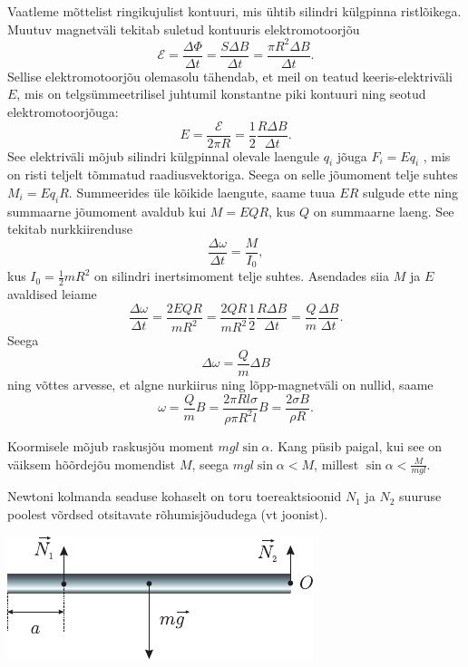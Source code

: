 \documentclass[10pt]{article}
\begin{document}
{%

\solu
Vaatleme mõttelist ringikujulist kontuuri, mis ühtib silindri külgpinna ristlõikega. Muutuv magnetväli tekitab suletud kontuuris elektromotoorjõu
\[
\mathcal{E}=\frac{\Delta \Phi}{\Delta t}=\frac{S \Delta B}{\Delta t}=\frac{\pi R^{2} \Delta B}{\Delta t}.
\]
Sellise elektromotoorjõu olemasolu tähendab, et meil on teatud keeris-elektriväli $E$, mis on telgsümmeetrilisel juhtumil konstantne piki kontuuri ning seotud elektromotoorjõuga:
\[
E=\frac{\mathcal{E}}{2 \pi R}=\frac{1}{2} \frac{R \Delta B}{\Delta t}.
\]
See elektriväli mõjub silindri külgpinnal olevale laengule $q_i$ jõuga $F_i = Eq_i$ , mis on risti teljelt tõmmatud raadiusvektoriga. Seega on selle jõumoment telje suhtes $M_i = Eq_iR$. Summeerides üle kõikide laengute, saame tuua $ER$ sulgude ette ning summaarne jõumoment avaldub kui $M = EQR$, kus $Q$ on summaarne laeng. See tekitab nurkkiirenduse
\[
\frac{\Delta \omega}{\Delta t}=\frac{M}{I_{0}},
\]
kus $I_0 = \frac{1}{2}mR^2$ on silindri inertsimoment telje suhtes. Asendades siia $M$ ja $E$ avaldised leiame
\[
\frac{\Delta \omega}{\Delta t}=\frac{2 E Q R}{m R^{2}}=\frac{2 Q R}{m R^{2}} \frac{1}{2} \frac{R \Delta B}{\Delta t}=\frac{Q}{m} \frac{\Delta B}{\Delta t}.
\]
Seega
\[
\Delta \omega=\frac{Q}{m} \Delta B
\]
ning võttes arvesse, et algne nurkiirus ning lõpp-magnetväli on nullid, saame
\[
\omega=\frac{Q}{m} B=\frac{2 \pi R l \sigma}{\rho \pi R^{2} l} B=\frac{2 \sigma B}{\rho R}.
\]
\probend
\bigskip


\solu
Koormisele mõjub raskusjõu moment $mgl\sin \alpha$. Kang püsib paigal, kui see on väiksem hõõrdejõu momendist $M$, seega $mgl\sin \alpha < M$, millest $\sin \alpha < \frac{M}{mgl}$.
\probend
\bigskip


\solu
Newtoni kolmanda seaduse kohaselt on toru toereaktsioonid $N_1$ ja $N_2$ suuruse poolest võrdsed otsitavate rõhumisjõududega (vt joonist).

\begin{center}
	\includegraphics[width=0.6\linewidth]{2007-lahg-02-lah}
\end{center}

}
\end{document}
